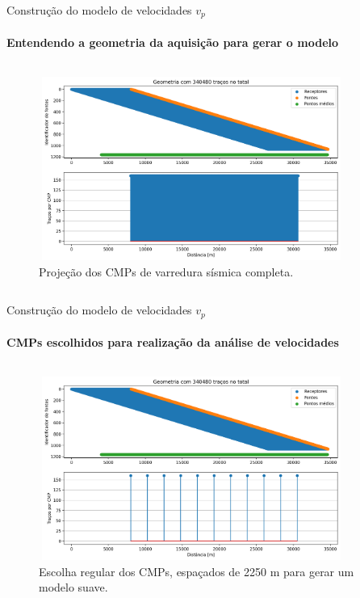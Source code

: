 \documentclass[xcolor=dvipsnames,t]{beamer}
\begin{document}
\begin{frame}{Construção do modelo de velocidades $v_p$}
	\framesubtitle{Entendendo a geometria da aquisição para gerar o modelo}	
	
	\pause	
	\begin{columns}[onlytextwidth, T]
		\begin{column}{.9\textwidth}
			\begin{figure}[h]
				\includegraphics[width=10cm,height=6cm]{../imagens/cmpTraceCountFullFold.png}	
				\tiny{\caption{Projeção dos CMPs de varredura sísmica completa.}} 	
			\end{figure}			
		\end{column}
	\end{columns}	
	
\end{frame}
\begin{frame}{Construção do modelo de velocidades $v_p$}
\framesubtitle{CMPs escolhidos para realização da análise de velocidades}	
		
\begin{columns}[onlytextwidth, T]
	\begin{column}{.9\textwidth}
		\begin{figure}[h]
			\includegraphics[width=10cm,height=6cm]{../imagens/cmpTraceCountVelAn.png}	
			\tiny{\caption{Escolha regular dos CMPs, espaçados de 2250 m para gerar um modelo suave.}} 	
		\end{figure}			
	\end{column}
\end{columns}	
	
\end{frame}
\end{document}
